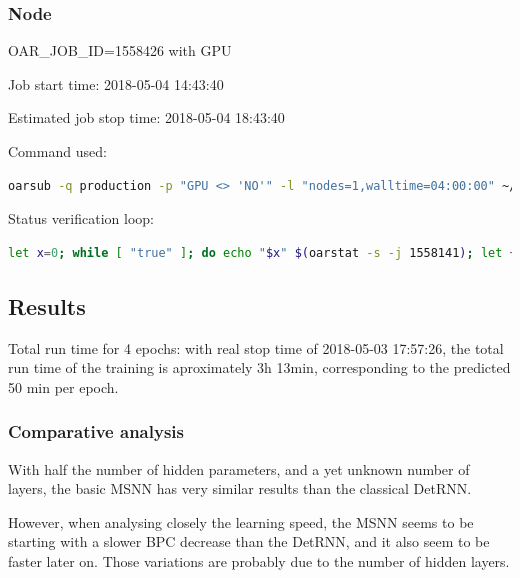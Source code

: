 \subsubsection{Node}

OAR\_JOB\_ID=1558426 with GPU

Job start time: 2018-05-04 14:43:40

Estimated job stop time: 2018-05-04 18:43:40

Command used:

\begin{lstlisting}[language=bash]
oarsub -q production -p "GPU <> 'NO'" -l "nodes=1,walltime=04:00:00" ~/alt-repo/awd-lstm-lm/rundet.sh
\end{lstlisting}

Status verification loop:

\begin{lstlisting}[language=bash]
let x=0; while [ "true" ]; do echo "$x" $(oarstat -s -j 1558141); let ++x; sleep 120; done
\end{lstlisting}

\subsection{Results}

Total run time for 4 epochs: with real stop time of 2018-05-03 17:57:26,
the total run time of the training is aproximately 3h 13min,
corresponding to the predicted 50 min per epoch.

\newpage
\subsubsection{Comparative analysis}

With half the number of hidden parameters, and a yet unknown number of
layers, the basic MSNN has very similar results than the classical
DetRNN.

However, when analysing closely the learning speed, the MSNN seems to be
starting with a slower BPC decrease than the DetRNN, and it also seem to
be faster later on. Those variations are probably due to the number of
hidden layers.

